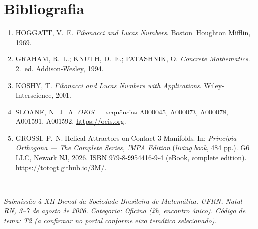 \documentclass[11pt,a4paper]{article}
\begin{document}
\section*{Bibliografia}

\begin{enumerate}[leftmargin=2em,itemsep=0em]
  \item HOGGATT, V.~E. \emph{Fibonacci and Lucas Numbers}. Boston: Houghton Mifflin, 1969.
  \item GRAHAM, R.~L.; KNUTH, D.~E.; PATASHNIK, O. \emph{Concrete Mathematics}. 2.~ed. Addison-Wesley, 1994.
  \item KOSHY, T. \emph{Fibonacci and Lucas Numbers with Applications}. Wiley-Interscience, 2001.
  \item SLOANE, N.~J.~A. \emph{OEIS} --- sequências A000045, A000073, A000078, A001591, A001592. \url{https://oeis.org}.
  \item GROSSI, P.~N. Helical Attractors on Contact 3-Manifolds. In: \emph{Principia Orthogona --- The Complete Series, IMPA Edition} (\emph{living book}, 484 pp.). G6 LLC, Newark NJ, 2026. ISBN 979-8-9954416-9-4 (eBook, complete edition). \url{https://totogt.github.io/3M/}.
\end{enumerate}

\vspace{1em}
\noindent\rule{\linewidth}{0.3pt}\\[0.3em]
\footnotesize
\emph{Submissão à XII Bienal da Sociedade Brasileira de Matemática. UFRN, Natal-RN, 3--7 de agosto de 2026. Categoria: Oficina (2h, encontro único). Código de tema: T2 (a confirmar no portal conforme eixo temático selecionado).}
\end{document}

